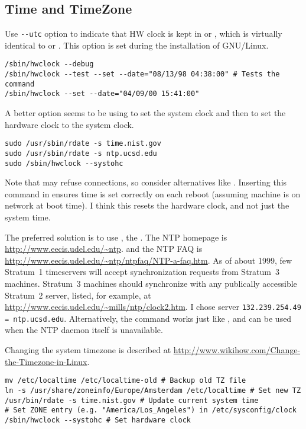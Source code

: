 \documentclass[12pt,twoside]{article}
\begin{document}
\subsection{Time and TimeZone}\label{sxn:tm}
Use \verb'--utc' option to indicate that HW clock is kept in
 or , which is
virtually identical to  or . 
This option is set during the installation of GNU/Linux.
\begin{verbatim}
/sbin/hwclock --debug
/sbin/hwclock --test --set --date="08/13/98 04:38:00" # Tests the command
/sbin/hwclock --set --date="04/09/00 15:41:00"
\end{verbatim}
A better option seems to be using  to set the system clock
and then  to set the hardware clock to the system clock.
\begin{verbatim}
sudo /usr/sbin/rdate -s time.nist.gov
sudo /usr/sbin/rdate -s ntp.ucsd.edu
sudo /sbin/hwclock --systohc
\end{verbatim}
Note that  may refuse connections, so consider
alternatives like .
Inserting this command in  ensures time is
set correctly on each reboot (assuming machine is on network at boot
time). 
I think this resets the hardware clock, and not just the system time.

The preferred solution is to use , the 
.
The NTP homepage is 
\url{http://www.eecis.udel.edu/~ntp}. 
and the NTP FAQ is
\url{http://www.eecis.udel.edu/~ntp/ntpfaq/NTP-a-faq.htm}. 
As of about 1999, few Stratum~1 timeservers will accept
synchronization requests from Stratum~3 machines.
Stratum~3 machines should synchronize with any publically accessible 
Stratum~2 server, listed, for example, at
\url{http://www.eecis.udel.edu/~mills/ntp/clock2.htm}.
I chose server \verb'132.239.254.49 = ntp.ucsd.edu'.
Alternatively, the  command works just like
, and can be used when the NTP daemon itself is
unavailable. 

Changing the system timezone is described at
\url{http://www.wikihow.com/Change-the-Timezone-in-Linux}. 
\begin{verbatim}
mv /etc/localtime /etc/localtime-old # Backup old TZ file
ln -s /usr/share/zoneinfo/Europe/Amsterdam /etc/localtime # Set new TZ
/usr/bin/rdate -s time.nist.gov # Update current system time
# Set ZONE entry (e.g. "America/Los_Angeles") in /etc/sysconfig/clock
/sbin/hwclock --systohc # Set hardware clock
\end{verbatim}
\end{document}
